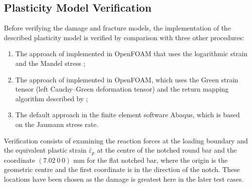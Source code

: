 \documentclass[sn-mathphys,Numbered]{sn-jnl}%
\begin{document}
\subsection{Plasticity Model Verification} \label{PlasticityTestCases}

Before verifying the damage and fracture models, the implementation of the described plasticity model is verified by comparison with three other procedures:
\begin{enumerate}[label=(\alph*)]
	\item The approach of \citet{clancy_improving_2019} implemented in OpenFOAM that uses the logarithmic strain and the Mandel stress \cite{caminero_modeling_2011};
	\item The approach of \citet{cardiff_lagrangian_2017} implemented in OpenFOAM, which uses the Green strain tensor (left Cauchy–Green deformation tensor) and the return mapping algorithm described by \citet{simo_computational_1998};
	\item The default approach in the finite element software Abaqus, which is based on the Jaumann stress rate.
\end{enumerate}

Verification consists of examining the reaction forces at the loading boundary and the equivalent plastic strain $\bar{\varepsilon}_p$ at the centre of the notched round bar and the coordinate $(7.02\ 0\ 0)$ mm for the flat notched bar, where the origin is the geometric centre and the first coordinate is in the direction of the notch.
These locations have been chosen as the damage is greatest here in the later test cases.





%
\end{document}
